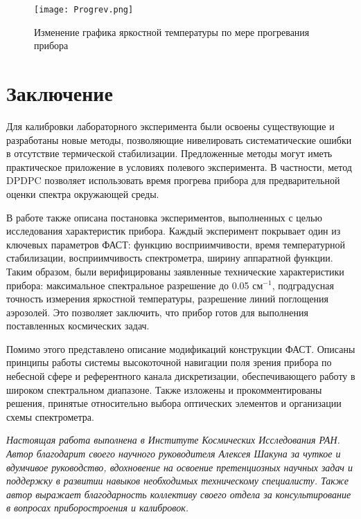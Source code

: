 \documentclass{mipt-thesis-bs}
\begin{document}
 	\begin{figure}[h!]
 	\centering
 	\texttt{[image: Progrev.png]}
 	\caption{Изменение графика яркостной температуры по мере прогревания прибора}
 \end{figure}
	
\chapter{Заключение}

	Для калибровки лабораторного эксперимента были освоены существующие и разработаны новые методы, позволяющие нивелировать систематические ошибки в отсутствие термической стабилизации. Предложенные методы могут иметь практическое приложение в условиях полевого эксперимента. В частности, метод DPDPC позволяет использовать время прогрева прибора для предварительной оценки спектра окружающей среды.  

 	В работе также описана постановка экспериментов, выполненных с целью исследования характеристик прибора. Каждый эксперимент покрывает один из ключевых параметров ФАСТ: функцию восприимчивости, время температурной стабилизации, восприимчивость спектрометра, ширину аппаратной функции. Таким образом, были верифицированы заявленные технические характеристики прибора: максимальное спектральное разрешение до 0.05 $см^{-1}$, подградусная точность измерения яркостной температуры, разрешение линий поглощения аэрозолей. Это позволяет заключить, что прибор готов для выполнения поставленных космических задач.
 	
	 Помимо этого представлено описание модификаций конструкции ФАСТ. Описаны принципы работы системы высокоточной навигации поля зрения прибора по небесной сфере и референтного канала дискретизации, обеспечивающего работу в широком спектральном диапазоне. Также изложены и прокомментированы решения, принятые относительно выбора оптических элементов и организации схемы спектрометра. 

\emph{Настоящая работа выполнена в Институте Космических Исследования РАН. Автор благодарит своего научного руководителя Алексея Шакуна за чуткое и вдумчивое руководство, вдохновение на освоение претенциозных научных задач и поддержку в развитии навыков необходимых техническому специалисту. Также автор выражает благодарность коллективу своего отдела за консультирование в вопросах приборостроения и калибровок.}

	\backmatter


\printbib


	

	
\end{document}
